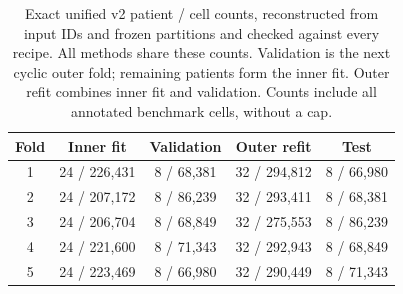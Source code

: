 \begin{table}[H]
\centering\small
\setlength{\tabcolsep}{4pt}
\begin{tabular}{ccccc}
\toprule
Fold & Inner fit & Validation & Outer refit & Test \\
\midrule
1 & 24 / 226,431 & 8 / 68,381 & 32 / 294,812 & 8 / 66,980 \\
2 & 24 / 207,172 & 8 / 86,239 & 32 / 293,411 & 8 / 68,381 \\
3 & 24 / 206,704 & 8 / 68,849 & 32 / 275,553 & 8 / 86,239 \\
4 & 24 / 221,600 & 8 / 71,343 & 32 / 292,943 & 8 / 68,849 \\
5 & 24 / 223,469 & 8 / 66,980 & 32 / 290,449 & 8 / 71,343 \\
\bottomrule
\end{tabular}
\caption{Exact unified v2 patient / cell counts, reconstructed from input IDs and frozen partitions and checked against every recipe. All methods share these counts. Validation is the next cyclic outer fold; remaining patients form the inner fit. Outer refit combines inner fit and validation. Counts include all annotated benchmark cells, without a cap.}
\label{tab:unified_fold_counts}
\end{table}
